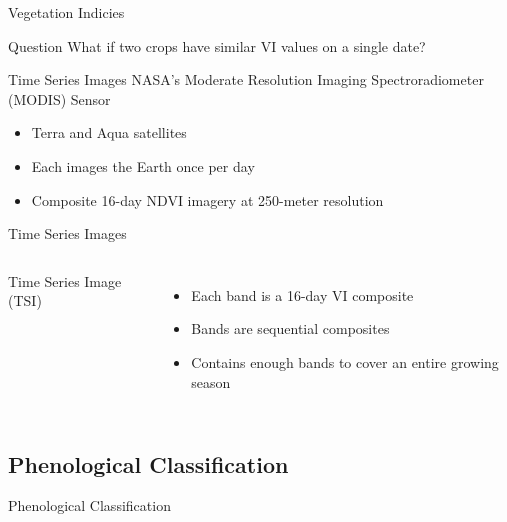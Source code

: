 \documentclass[draft,compress]{beamer}
\begin{document}
\begin{frame}{Vegetation Indicies}
\begingroup
{}
\begin{block}{Question}
What if two crops have similar VI values on a single date?
\end{block}
\endgroup
{}
\end{frame}

\begin{frame}{Time Series Images}
NASA's Moderate Resolution Imaging Spectroradiometer (MODIS) Sensor
\begin{itemize}
  \item<1-> Terra and Aqua satellites
  \item<2-> Each images the Earth once per day
  \item<3-> Composite 16-day NDVI imagery at 250-meter resolution
\end{itemize}
\end{frame}


\begin{frame}{Time Series Images}
\begin{columns}[c]
Time Series Image (TSI)
\begin{itemize}
  \item<+-> Each band is a 16-day VI composite
  \item<+-> Bands are sequential composites
  \item<+-> Contains enough bands to cover an entire growing season
\end{itemize}


\end{columns}
\end{frame}

\subsection{Phenological Classification}
\begin{frame}{Phenological Classification}

\begin{figure}
  \centering
\end{figure}

\end{frame}
\end{document}
